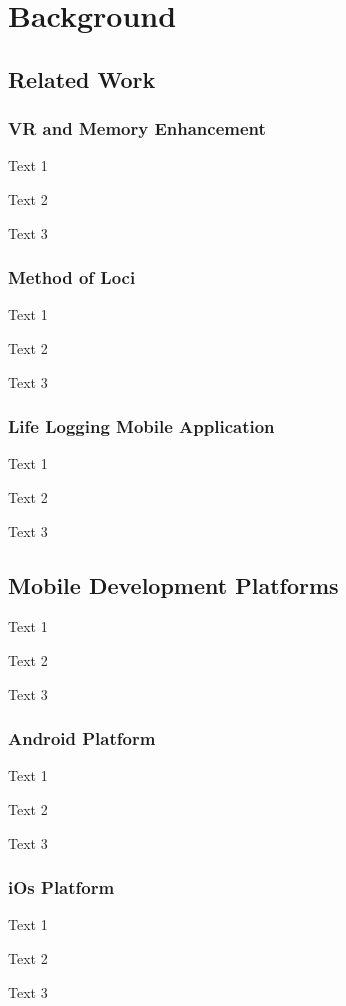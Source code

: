 \chapter{Background}\label{chap:background}
  
\section{Related Work} \label{sec:b1}

\subsection{VR and Memory Enhancement} \label{sec:b1.1}
Text 1

Text 2

Text 3

\subsection{Method of Loci} \label{sec:b1.2}
Text 1

Text 2

Text 3

\subsection{Life Logging Mobile Application} \label{sec:b1.3}
Text 1

Text 2

Text 3

\section{Mobile Development Platforms} \label{sec:b2}
Text 1

Text 2

Text 3

\subsection{Android Platform} \label{sec:b2.1}
Text 1

Text 2

Text 3

\subsection{iOs Platform} \label{sec:b2.2}
Text 1

Text 2

Text 3

